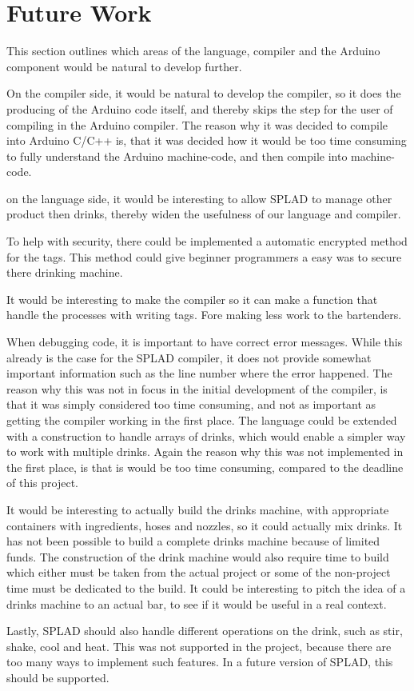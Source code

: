 \section{Future Work} %
This section outlines which areas of the language, compiler and the Arduino component would be natural to develop further.

On the compiler side, it would be natural to develop the compiler, so it does the producing of the Arduino code itself, and thereby skips the step for the user of compiling in the Arduino compiler. The reason why it was decided to compile into Arduino C/C++ is, that it was decided how it would be too time consuming to fully understand the Arduino machine-code, and then compile into machine-code.

on the language side, it would be interesting to allow SPLAD to manage other product then drinks, thereby widen the usefulness of our language and compiler.

To help with security, there could be implemented a automatic encrypted method for the tags. This method could give beginner programmers a easy was to secure there drinking machine.

It would be interesting to make the compiler so it can make a function that handle the processes with writing tags. Fore making less work to the bartenders.

When debugging code, it is important to have correct error messages. While this already is the case for the SPLAD compiler, it does not provide somewhat important information such as the line number where the error happened. The reason why this was not in focus in the initial development of the compiler, is that it was simply considered too time consuming, and not as important as getting the compiler working in the first place. The language could be extended with a construction to handle arrays of drinks, which would enable a simpler way to work with multiple drinks. Again the reason why this was not implemented in the first place, is that is would be too time consuming, compared to the deadline of this project.

It would be interesting to actually build the drinks machine, with appropriate containers with ingredients, hoses and nozzles, so it could actually mix drinks. It has not been possible to build a complete drinks machine because of limited funds. The construction of the drink machine would also require time to build which either must be taken from the actual project or some of the non-project time must be dedicated to the build. It could be interesting to pitch the idea of a drinks machine to an actual bar, to see if it would be useful in a real context.

Lastly, SPLAD should also handle different operations on the drink, such as stir, shake, cool and heat. This was not supported in the project, because there are too many ways to implement such features. In a future version of SPLAD, this should be supported.